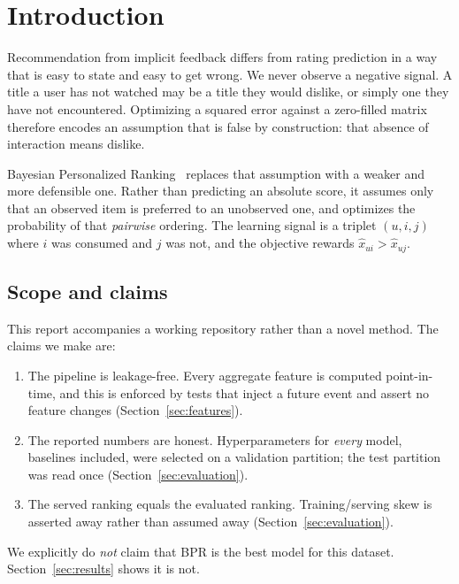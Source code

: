 \section{Introduction}
\label{sec:introduction}

Recommendation from implicit feedback differs from rating prediction in a way
that is easy to state and easy to get wrong. We never observe a negative
signal. A title a user has not watched may be a title they would dislike, or
simply one they have not encountered. Optimizing a squared error against a
zero-filled matrix therefore encodes an assumption that is false by
construction: that absence of interaction means dislike.

Bayesian Personalized Ranking~\cite{rendle2009bpr} replaces that assumption
with a weaker and more defensible one. Rather than predicting an absolute
score, it assumes only that an observed item is preferred to an unobserved
one, and optimizes the probability of that \emph{pairwise} ordering. The
learning signal is a triplet $(u, i, j)$ where $i$ was consumed and $j$ was
not, and the objective rewards $\hat{x}_{ui} > \hat{x}_{uj}$.

\subsection{Scope and claims}

This report accompanies a working repository rather than a novel method. The
claims we make are:

\begin{enumerate}
  \item The pipeline is leakage-free. Every aggregate feature is computed
        point-in-time, and this is enforced by tests that inject a future
        event and assert no feature changes (Section~\ref{sec:features}).
  \item The reported numbers are honest. Hyperparameters for \emph{every}
        model, baselines included, were selected on a validation partition;
        the test partition was read once (Section~\ref{sec:evaluation}).
  \item The served ranking equals the evaluated ranking. Training/serving
        skew is asserted away rather than assumed away
        (Section~\ref{sec:evaluation}).
\end{enumerate}

We explicitly do \emph{not} claim that BPR is the best model for this dataset.
Section~\ref{sec:results} shows it is not.

